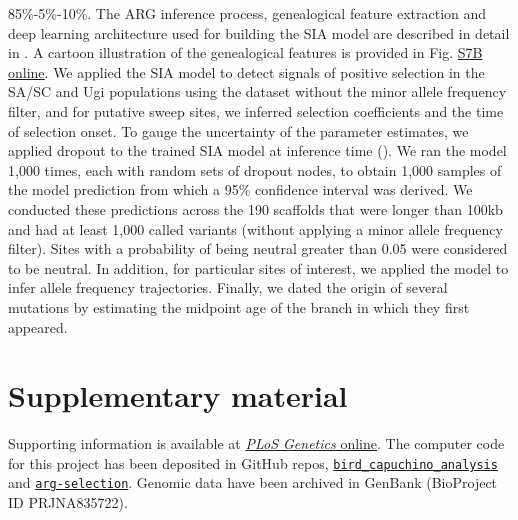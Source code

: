 85\%-5\%-10\%. The \ac{ARG} inference process, genealogical feature extraction and deep learning architecture used for building the \ac{SIA} model are described in detail in \cite{hejase_deep-learning_2022}. A cartoon illustration of the genealogical features is provided in Fig. \href{https://journals.plos.org/PLOSGENETICS/article?id=10.1371/journal.pgen.1010474#sec017}{S7B online}. We applied the \ac{SIA} model to detect signals of positive selection in the \ac{SA/SC} and Ugi populations using the dataset without the minor allele frequency filter, and for putative sweep sites, we inferred selection coefficients and the time of selection onset. To gauge the uncertainty of the parameter estimates, we applied dropout to the trained \ac{SIA} model at inference time (\cite{gal_dropout_2016}). We ran the model 1,000 times, each with random sets of dropout nodes, to obtain 1,000 samples of the model prediction from which a 95\% confidence interval was derived. We conducted these predictions across the 190 scaffolds that were longer than 100kb and had at least 1,000 called variants (without applying a minor allele frequency filter). Sites with a probability of being neutral greater than 0.05 were considered to be neutral. In addition, for particular sites of interest, we applied the model to infer allele frequency trajectories. Finally, we dated the origin of several mutations by estimating the midpoint age of the branch in which they first appeared.

\section{Supplementary material}
Supporting information is available at \href{https://journals.plos.org/PLOSGENETICS/article?id=10.1371/journal.pgen.1010474#sec017}{\textit{PLoS Genetics} online}. The computer code for this project has been deposited in GitHub repos, \href{https://github.com/CshlSiepelLab/bird_capuchino_analysis}{\texttt{bird\_capuchino\_analysis}} and \href{https://github.com/CshlSiepelLab/arg-selection}{\texttt{arg-selection}}. Genomic data have been archived in GenBank (BioProject ID PRJNA835722).